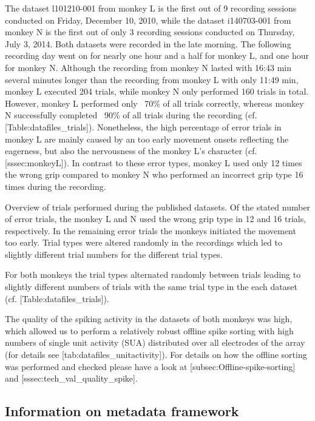 The dataset l101210-001 from monkey L is the first out of 9 recording sessions conducted on Friday, December 10, 2010, while the dataset i140703-001 from monkey N is the first out of only 3 recording sessions conducted on Thursday, July 3, 2014. Both datasets were recorded in the late morning. The following recording day went on for nearly one hour and a half for monkey L, and one hour for monkey N. Although the recording from monkey N lasted with 16:43 min several minutes longer than the recording from monkey L with only 11:49 min, monkey L executed 204 trials, while monkey N only performed 160 trials in total. However, monkey L performed only ~70\% of all trials correctly, whereas monkey N successfully completed ~90\% of all trials during the recording (cf. [Table:datafiles\_trials]). Nonetheless, the high percentage of error trials in monkey L are mainly caused by an too early movement onsets reflecting the eagerness, but also the nervousness of the monkey L's character (cf. [sssec:monkeyL]). In contrast to these error types, monkey L used only 12 times the wrong grip compared to monkey N who performed an incorrect grip type 16 times during the recording. 

Overview of trials performed during the published datasets. Of the stated number of error trials, the monkey L and N used the wrong grip type in 12 and 16 trials, respectively. In the remaining error trials the monkeys initiated the movement too early. Trial types were altered randomly in the recordings which led to slightly different trial numbers for the different trial types.

For both monkeys the trial types alternated randomly between trials leading to slightly different numbers of trials with the same trial type in the each dataset (cf. [Table:datafiles\_trials]). 



The quality of the spiking activity in the datasets of both monkeys was high, which allowed us to perform a relatively robust offline spike sorting with high numbers of single unit activity (SUA) distributed over all electrodes of the array (for details see [tab:datafiles\_unitactivity]). For details on how the offline sorting was performed and checked please have a look at [subsec:Offline-spike-sorting] and [sssec:tech\_val\_quality\_spike]. 

\subsection{Information on metadata framework}

